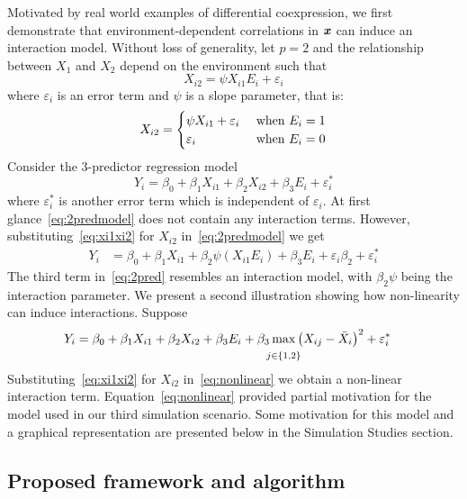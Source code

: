 Motivated by real world examples of differential coexpression, we first demonstrate that environment-dependent correlations in $\textbf{\emph{x}}$ can induce an interaction model. Without loss of generality, let $p=2$ and the relationship between $X_1$ and $X_2$ depend on the environment such that 
\begin{equation}
X_{i2} = \psi X_{i1} E_{i} + \varepsilon_i   \label{eq:xi1xi2}
\end{equation} 
where $\varepsilon_i$ is an error term and $\psi$ is a slope parameter, that is:
$$
X_{i2} = 
\begin{cases}
\psi X_{i1} + \varepsilon_{i} & \textrm{{ when }} E_i = 1   \\
\varepsilon_{i} & \textrm{{ when }} E_i = 0
\end{cases}
$$
Consider the 3-predictor regression model 
\begin{equation}
Y_i = \beta_0 +  \beta_1 X_{i1} + \beta_2 X_{i2} + \beta_3 E_i +  \varepsilon_{i}^* \label{eq:2predmodel}
\end{equation}
where $\varepsilon_{i}^*$ is another error term which is independent of $\varepsilon_{i}$. At first glance~\eqref{eq:2predmodel} does not contain any interaction terms. However, substituting~\eqref{eq:xi1xi2} for $X_{i2}$ in~\eqref{eq:2predmodel} we get
\begin{align}
Y_i & = \beta_0 +  \beta_1 X_{i1} + \beta_2 \psi \left( X_{i1} E_i  \right) +  \beta_3 E_i +  \varepsilon_i \beta_2 + \varepsilon_i^*  \label{eq:2pred}
\end{align}
The third term in~\eqref{eq:2pred} resembles an interaction model, with $\beta_2 \psi$ being the interaction parameter. We present a second illustration showing how non-linearity can induce interactions. Suppose
\begin{align}
Y_i & = \beta_0 + \beta_1 X_{i1} + \beta_2 X_{i2} + \beta_3 E_i + \beta_3  \max_{\mathclap{\substack{\textcolor{white}{text} \\ j\in \left\lbrace 1, 2 \right\rbrace}}}   \left(  X_{ij} - \bar{X}_i   \right)^2 + \varepsilon_i^* \label{eq:nonlinear}
\end{align} Substituting~\eqref{eq:xi1xi2} for $X_{i2}$ in~\eqref{eq:nonlinear} we obtain a non-linear interaction term. Equation~\eqref{eq:nonlinear} provided partial motivation for the model used in our third simulation scenario. Some motivation for this model and a graphical representation are presented below in the Simulation Studies section.


\subsection{Proposed framework and algorithm}

